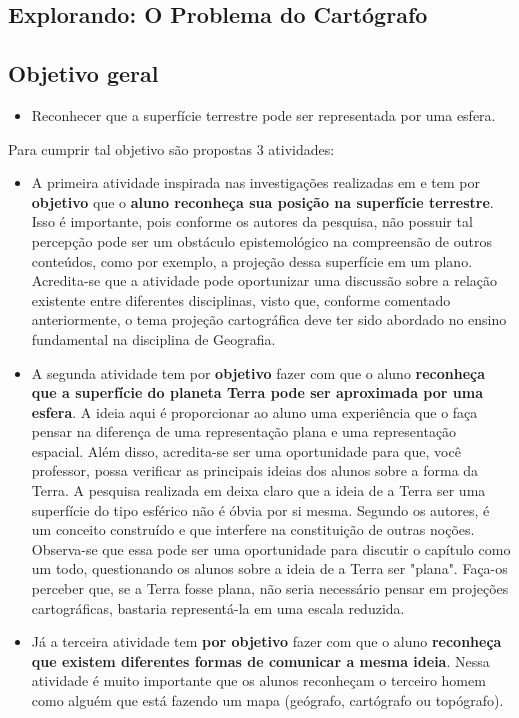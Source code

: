\def\currentcolor{session1}
\begin{texto}
{
	\section{Explorando: O Problema do Cartógrafo}

	\subsection{Objetivo geral}
	\begin{itemize}
	\item Reconhecer que a superfície terrestre pode ser representada por uma esfera.
	\end{itemize}

	Para cumprir tal objetivo são propostas 3 atividades:
	\begin{itemize}
	\item A primeira atividade inspirada nas investigações realizadas em \cite{Nussbaum} e \cite{Nardi}  tem por \textbf{objetivo} que o \textbf{aluno reconheça sua posição na superfície terrestre}. Isso é importante, pois conforme os autores da pesquisa, não possuir tal percepção pode ser um obstáculo epistemológico na compreensão de outros conteúdos, como por exemplo, a projeção dessa superfície em um plano. Acredita-se que a atividade pode oportunizar uma discussão sobre a relação existente entre diferentes disciplinas, visto que, conforme comentado anteriormente, o tema projeção cartográfica deve ter sido abordado no ensino fundamental na disciplina de Geografia.
	\item A segunda atividade tem por \textbf{objetivo} fazer com que o aluno \textbf{reconheça que a superfície do planeta Terra pode ser aproximada por uma esfera}. A ideia aqui é proporcionar ao aluno uma experiência que o faça pensar na diferença de uma representação plana e uma representação espacial. Além disso, acredita-se ser uma oportunidade para que, você professor, possa verificar as principais ideias dos alunos sobre a forma da Terra. A pesquisa realizada em \cite{Nussbaum1} deixa claro que a ideia de a Terra ser uma superfície do tipo esférico não é óbvia por si mesma. Segundo os autores, é um conceito construído e que interfere na constituição de outras noções. Observa-se que essa pode ser uma oportunidade para discutir o capítulo como um todo, questionando os alunos sobre a ideia de a Terra ser "plana". Faça-os perceber que, se a Terra fosse plana, não seria necessário pensar em projeções cartográficas, bastaria representá-la em uma escala reduzida.
	\item Já a terceira atividade tem \textbf{por objetivo} fazer com que o aluno \textbf{reconheça que existem diferentes formas de comunicar a mesma ideia}. Nessa atividade é muito importante que os alunos reconheçam o terceiro homem como alguém que está fazendo um mapa (geógrafo, cartógrafo ou topógrafo).
	\end{itemize}
}
\end{texto}
\label{cart_1}


